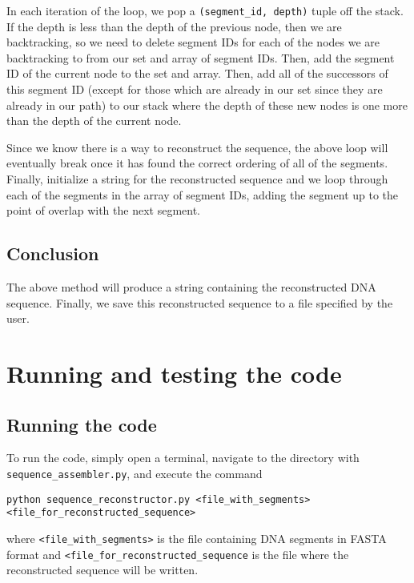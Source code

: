 \documentclass{article}
\begin{document}
In each iteration of the loop, we pop a \texttt{(segment\_id, depth)} tuple off the stack. If the depth is less than the depth of the previous node, then we are backtracking, so we need to delete segment IDs for each of the nodes we are backtracking to from our set and array of segment IDs. Then, add the segment ID of the current node to the set and array. Then, add all of the successors of this segment ID (except for those which are already in our set since they are already in our path) to our stack where the depth of these new nodes is one more than the depth of the current node.

Since we know there is a way to reconstruct the sequence, the above loop will eventually break once it has found the correct ordering of all of the segments. Finally, initialize a string for the reconstructed sequence and we loop through each of the segments in the array of segment IDs, adding the segment up to the point of overlap with the next segment.

\subsection{Conclusion}

The above method will produce a string containing the reconstructed DNA sequence. Finally, we save this reconstructed sequence to a file specified by the user.

\section{Running and testing the code}

\subsection{Running the code}

To run the code, simply open a terminal, navigate to the directory with \texttt{sequence\_assembler.py}, and execute the command

\vspace{5 mm}

\noindent
\texttt{python sequence\_reconstructor.py <file\_with\_segments> <file\_for\_reconstructed\_sequence>}

\vspace{5 mm}

\noindent
where \texttt{<file\_with\_segments>} is the file containing DNA segments in FASTA format and \texttt{<file\_for\_reconstructed\_sequence} is the file where the reconstructed sequence will be written.
\end{document}
